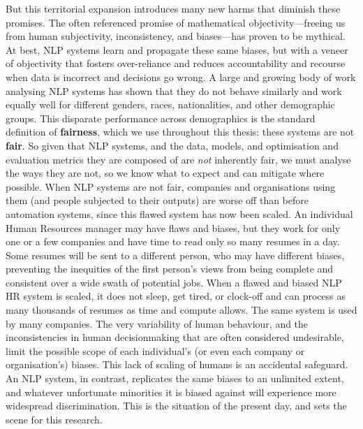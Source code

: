 But this territorial expansion introduces many new harms that diminish these promises.  
The often referenced promise of mathematical objectivity---freeing us from human subjectivity, inconsistency, and biases---has proven to be mythical. 
At best, NLP systems learn and propagate these same biases, but with a veneer of objectivity that fosters over-reliance \citep{oneil2016weapons} and reduces accountability and recourse when data is incorrect and decisions go wrong. 
A large and growing body of work analysing NLP systems has shown that they do not behave similarly and work equally well for different genders, races, nationalities, and other demographic groups. This disparate performance across demographics is the standard definition of \textbf{fairness}, which we use throughout this thesis: these systems are not \textbf{fair}. 
So given that NLP systems, and the data, models, and optimisation and evaluation metrics they are composed of are \textit{not} inherently fair, we must analyse the ways they are not, so we know what to expect and can mitigate where possible. When NLP systems are not fair, companies and organisations using them (and people subjected to their outputs) are worse off than before automation systems, since this flawed system has now been scaled. An individual Human Resources manager may have flaws and biases, but they work for only one or a few companies and have time to read only so many resumes in a day. Some resumes will be sent to a different person, who may have different biases, preventing the inequities of the first person's views from being complete and consistent over a wide swath of potential jobs. When a flawed and biased NLP HR system is scaled, it does not sleep, get tired, or clock-off and can process as many thousands of resumes as time and compute allows. The same system is used by many companies. The very variability of human behaviour, and the inconsistencies in human decisionmaking that are often considered undesirable, limit the possible scope of each individual's (or even each company or organisation's) biases. This lack of scaling of humans is an accidental safeguard. An NLP system, in contrast, replicates the same biases to an unlimited extent, and whatever unfortunate minorities it is biased against will experience more widespread discrimination. This is the situation of the present day, and sets the scene for this research.

